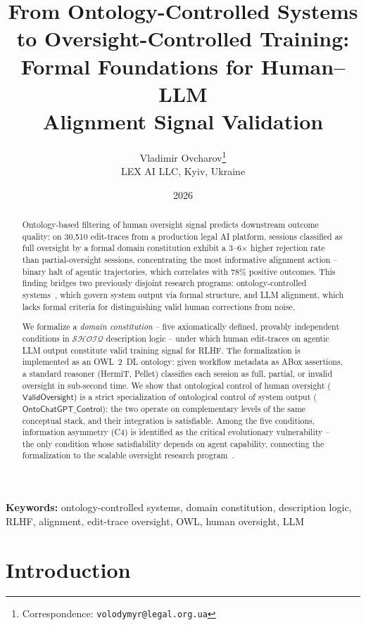 \documentclass[11pt]{article}
\title{%
  From Ontology-Controlled Systems \\
  to Oversight-Controlled Training: \\
  Formal Foundations for Human--LLM \\
  Alignment Signal Validation%
}
\author{
  Vladimir Ovcharov\thanks{Correspondence: \texttt{volodymyr@legal.org.ua}}\\[4pt]
  LEX AI LLC, Kyiv, Ukraine\\
}
\date{2026}
\newcommand{\DL}{\ensuremath{\mathcal{SHOIQ}}\xspace}
\begin{document}
\maketitle

\begin{abstract}
Ontology-based filtering of human oversight signal predicts downstream outcome quality: on 30{,}510 edit-traces from a production legal AI platform, sessions classified as full oversight by a formal domain constitution exhibit a 3--6$\times$ higher rejection rate than partial-oversight sessions, concentrating the most informative alignment action -- binary halt of agentic trajectories, which correlates with 78\% positive outcomes.
This finding bridges two previously disjoint research programs: ontology-controlled systems~\citep{palagin2006architecture, palagin2023ontochatgpt}, which govern system output via formal structure, and LLM alignment, which lacks formal criteria for distinguishing valid human corrections from noise.

We formalize a \emph{domain constitution} -- five axiomatically defined, provably independent conditions in \DL description logic -- under which human edit-traces on agentic LLM output constitute valid training signal for RLHF.
The formalization is implemented as an OWL~2~DL ontology: given workflow metadata as ABox assertions, a standard reasoner (HermiT, Pellet) classifies each session as full, partial, or invalid oversight in sub-second time.
We show that ontological control of human oversight ($\mathsf{ValidOversight}$) is a strict specialization of ontological control of system output ($\mathsf{OntoChatGPT\_Control}$): the two operate on complementary levels of the same conceptual stack, and their integration is satisfiable.
Among the five conditions, information asymmetry (C4) is identified as the critical evolutionary vulnerability -- the only condition whose satisfiability depends on agent capability, connecting the formalization to the scalable oversight research program~\citep{bowman2022measuring}.
\end{abstract}

\noindent\textbf{Keywords:} ontology-controlled systems, domain constitution, description logic, RLHF, alignment, edit-trace oversight, OWL, human oversight, LLM

\section{Introduction}
\label{sec:intro}
\end{document}
